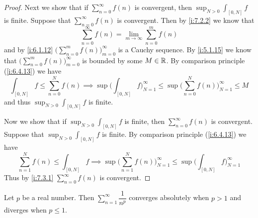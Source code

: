 \begin{proof}
  Next we show that if \(\sum_{n = 0}^\infty f(n)\) is convergent, then \(\sup_{N > 0} \int_{[0, N]} f\) is finite.
  Suppose that \(\sum_{n = 0}^\infty f(n)\) is convergent.
  Then by \cref{i:7.2.2} we know that
  \[
    \sum_{n = 0}^\infty f(n) = \lim_{m \to \infty} \sum_{n = 0}^m f(n)
  \]
  and by \cref{i:6.1.12} \(\big(\sum_{n = 0}^m f(n)\big)_{m = 0}^\infty\) is a Cauchy sequence.
  By \cref{i:5.1.15} we know that \(\big(\sum_{n = 0}^m f(n)\big)_{m = 0}^\infty\) is bounded by some \(M \in \mathbb{R}\).
  By comparison principle (\cref{i:6.4.13}) we have
  \[
    \int_{[0, N]} f \leq \sum_{n = 0}^N f(n) \implies \sup\bigg(\int_{[0, N]} f\bigg)_{N = 1}^\infty \leq \sup\bigg(\sum_{n = 0}^N f(n)\bigg)_{N = 1}^\infty \leq M
  \]
  and thus \(\sup_{N > 0} \int_{[0, N]} f\) is finite.

  Now we show that if \(\sup_{N > 0} \int_{[0, N]} f\) is finite, then \(\sum_{n = 0}^\infty f(n)\) is convergent.
  Suppose that \(\sup_{N > 0} \int_{[0, N]} f\) is finite.
  By comparison principle (\cref{i:6.4.13}) we have
  \[
    \sum_{n = 1}^N f(n) \leq \int_{[0, N]} f \implies \sup\bigg(\sum_{n = 1}^N f(n)\bigg)_{N = 1}^\infty \leq \sup\bigg(\int_{[0, N]} f\bigg)_{N = 1}^\infty
  \]
  Thus by \cref{i:7.3.1} \(\sum_{n = 0}^\infty f(n)\) is convergent.
\end{proof}

\begin{cor}\label{i:11.6.5}
  Let \(p\) be a real number.
  Then \(\sum_{n = 1}^\infty \dfrac{1}{n^p}\) converges absolutely when \(p > 1\) and diverges when \(p \leq 1\).
\end{cor}

